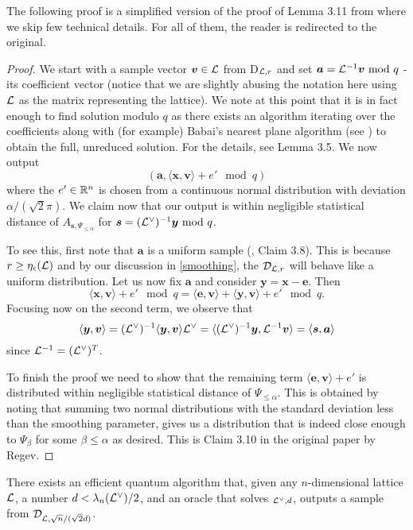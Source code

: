 The following proof is a simplified version of the proof of Lemma 3.11 from \cite{regev} where we skip few technical details. For all of them, the reader is redirected to the original.
\begin{proof}
        We start with a sample vector $\boldsymbol{v} \in \mathcal{L}$ from D$_{\mathcal{L}, r}$ and set $\boldsymbol{a} = \mathcal{L}^{-1} \boldsymbol{v} \text{ mod } q$ - its coefficient vector (notice that we are slightly abusing the notation here using $\mathcal{L}$ as the matrix representing the lattice). We note at this point that it is in fact enough to find solution modulo $q$ as there exists an algorithm iterating over the coefficients along with (for example) Babai's nearest plane algorithm (see \cite{babai}) to obtain the full, unreduced solution. For the details, see \cite{regev} Lemma 3.5. We now output
        \begin{equation} (\bm{a}, \langle \bm{x}, \bm{v} \rangle + e' \mod q) \end{equation}
        where the $e' \in \mathbb{R}^n$ is chosen from a continuous normal distribution with deviation $\alpha/(\sqrt{2} \pi)$. We claim now that our output is within negligible statistical distance of $A_{\bm{s}, \Psi_{\leq \alpha}}$ for $\boldsymbol{s} = (\mathcal{L}^{\vee})^{-1}\boldsymbol{y} \text{ mod } q$.

        To see this, first note that $\bm{a}$ is a uniform sample (\cite{regev}, Claim 3.8). This is because $r \geq \eta_{\epsilon}(\mathcal{L})$ and by our discussion in \ref{smoothing}, the $\mathcal{D}_{\mathcal{L}, r}$ will behave like a uniform distribution. Let us now fix $\bm{a}$ and consider $\bm{y} = \bm{x} - \bm{e}$. Then
        \[ \langle \bm{x}, \bm{v} \rangle + e' \mod q = \langle \bm{e}, \bm{v} \rangle + \langle \bm{y}, \bm{v} \rangle + e' \mod q. \]
Focusing now on the second term, we observe that
\[ \langle \boldsymbol{y}, \boldsymbol{v} \rangle = (\mathcal{L}^{\vee})^{-1} \langle \boldsymbol{y}, \boldsymbol{v} \rangle \mathcal{L}^{\vee} =  \langle (\mathcal{L}^{\vee})^{-1}\boldsymbol{y}, \mathcal{L}^{-1} \boldsymbol{v} \rangle = \langle \boldsymbol{s}, \boldsymbol{a} \rangle \]
since $\mathcal{L}^{-1} = (\mathcal{L}^{\vee})^T$.

To finish the proof we need to show that the remaining term $\langle \bm{e}, \bm{v} \rangle + e'$ is distributed within negligible statistical distance of $\Psi_{\leq \alpha}$. This is obtained by noting that summing two normal distributions with the standard deviation less than the smoothing parameter, gives us a distribution that is indeed close enough to $\Psi_{\beta}$ for some $\beta \leq \alpha$ as desired. This is Claim 3.10 in the original paper by Regev.
\end{proof}
\begin{proposition}\label{quantum}
        There exists an efficient quantum algorithm that, given any $n$-dimensional lattice $\mathcal{L}$, a number $d < \lambda_n (\mathcal{L}^{\vee})/2$, and an oracle that solves $_{\mathcal{L}^{\vee},d}$, outputs a sample from $\mathcal{D}_{\mathcal{L},\sqrt{n}/(\sqrt{2}d)}$.
\end{proposition}

